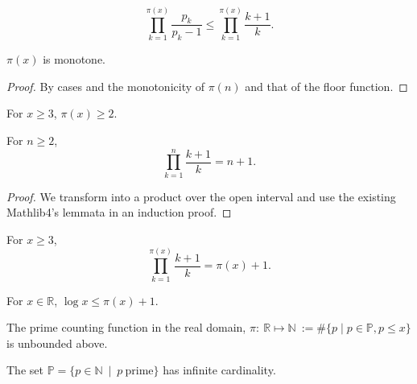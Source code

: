 \begin{lemma}
\label{lem:lemma4}
$$\prod_{k=1}^{\pi(x)}\frac{p_k}{p_k-1} \le \prod_{k=1}^{\pi(x)}\frac{k+1}{k}.$$
\end{lemma}

\begin{lemma}
\label{lem:lemma5-2-1}
\leanok
$\pi(x)$ is monotone.
\end{lemma}
\begin{proof}
\leanok
By cases and the monotonicity of $\pi(n)$ and that of the floor function.
\end{proof}

\begin{lemma}
\label{lem:lemma5-2}
\leanok
For $x\ge3$, $\pi(x)\ge2$.
\end{lemma}

\begin{lemma}
\label{lem:lemma5-1}
\leanok
For $n\ge2$,
    $$\prod_{k=1}^{n}\frac{k+1}{k} = n+1.$$
\end{lemma}
\begin{proof}
\leanok
We transform into a product over the open interval and use the existing Mathlib4's lemmata in an induction proof.
\end{proof}

\begin{lemma}
\label{lem:lemma5}
\leanok
For $x\ge3$,
    $$\prod_{k=1}^{\pi(x)}\frac{k+1}{k} = \pi(x)+1.$$
\end{lemma}

\begin{theorem}
\label{thm:log_le_primeCountingReal_add_one}
\leanok
For $x\in\mathbb{R}$, $\log x \le \pi(x) +1$.
\end{theorem}

\begin{theorem}
\label{thm:primeCountingReal_unbounded}
\leanok
The prime counting function in the real domain, $\pi:\ \mathbb{R} \mapsto \mathbb{N} \ := \#\big\{p\mid p \in\mathbb{P}, p\le x \big\}$ is unbounded above.
\end{theorem}

\begin{theorem}
\label{thm:infinite_primes}
The set $\mathbb{P} = \big\{p \in \mathbb{N} \ \mid \ p \ \mathrm{prime} \big\}$ has infinite cardinality. 
\end{theorem}

